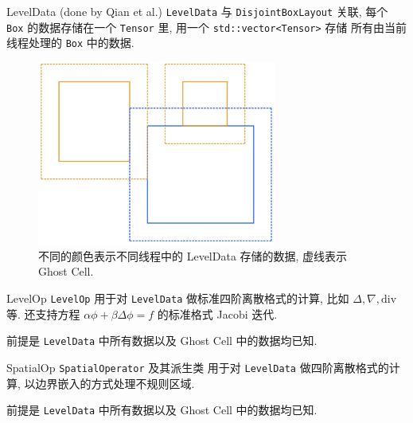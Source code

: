 \documentclass[10pt]{beamer}
\begin{document}
\begin{frame}[fragile]{LevelData (done by Qian et al.)}
    \footnotesize
    \verb|LevelData| 与 \verb|DisjointBoxLayout| 关联,
    每个 \verb|Box| 的数据存储在一个 \verb|Tensor| 里,
    用一个 \verb|std::vector<Tensor>| 存储
    所有由当前线程处理的 \verb|Box| 中的数据.

    \begin{figure}[H]
        \centering
        \includegraphics[width=0.7\textwidth]{jpg/LevelData.jpeg}
        \caption{\footnotesize 不同的颜色表示不同线程中的 LevelData 存储的数据, 虚线表示 Ghost Cell.}
    \end{figure}
\end{frame}

\begin{frame}[fragile]{LevelOp}
    \footnotesize
    \verb|LevelOp| 用于对 \verb|LevelData| 做标准四阶离散格式的计算, 
    比如 $\Delta, \nabla, \text{div}$ 等.
    还支持方程 $\alpha\phi+\beta\Delta\phi=f$ 的标准格式 Jacobi 迭代.

    \vspace{1em}
    前提是 \verb|LevelData| 中所有数据以及 Ghost Cell 中的数据均已知.
\end{frame}

\begin{frame}[fragile]{SpatialOp}
    \footnotesize
    \verb|SpatialOperator| 及其派生类
    用于对 \verb|LevelData| 做四阶离散格式的计算, 
    以边界嵌入的方式处理不规则区域.

    \vspace{1em}
    前提是 \verb|LevelData| 中所有数据以及 Ghost Cell 中的数据均已知.
\end{frame}
\end{document}
